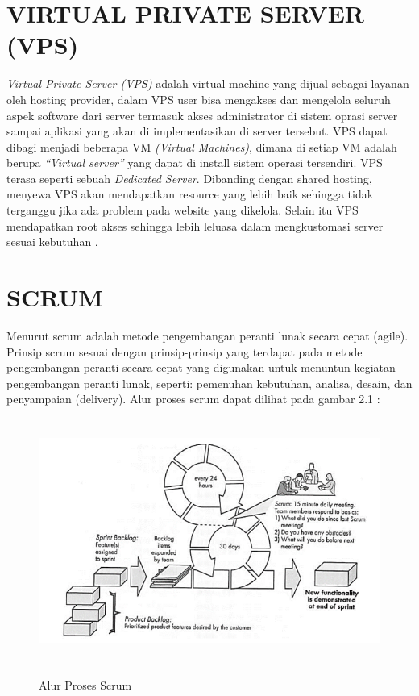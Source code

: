 \section{\uppercase{Virtual Private Server (VPS)}}
\textit{Virtual Private Server (VPS)} adalah virtual machine yang dijual sebagai layanan oleh hosting provider, dalam VPS user bisa mengakses dan mengelola seluruh aspek software dari server termasuk akses administrator di sistem oprasi server sampai aplikasi yang akan di implementasikan di server tersebut. VPS dapat dibagi menjadi beberapa VM \textit{(Virtual Machines)}, dimana di setiap VM adalah berupa \textit{“Virtual server”} yang dapat di install sistem operasi tersendiri. VPS terasa seperti sebuah \textit{Dedicated Server}. Dibanding dengan shared hosting, menyewa VPS akan mendapatkan resource yang lebih baik sehingga tidak terganggu jika ada problem pada website yang dikelola. Selain itu VPS mendapatkan root akses sehingga lebih leluasa dalam mengkustomasi server sesuai kebutuhan \citep{hamida2017analisis}.

\section{\uppercase{Scrum}}
Menurut \cite{pressman2010} scrum adalah metode pengembangan peranti lunak secara cepat (agile). Prinsip scrum sesuai dengan prinsip-prinsip yang terdapat pada metode pengembangan peranti secara cepat yang digunakan untuk menuntun kegiatan pengembangan peranti lunak, seperti: pemenuhan kebutuhan, analisa, desain, dan penyampaian (delivery). Alur proses scrum dapat dilihat pada gambar 2.1 : 

\begin{figure}[H]
\centering
{\includegraphics [width = 12.5cm, height= 8cm]{gambar/alur_proses_scrum}}
\caption{Alur Proses Scrum \citep{pressman2010}}
\label{alur_proses_scrum}
\end{figure}	

